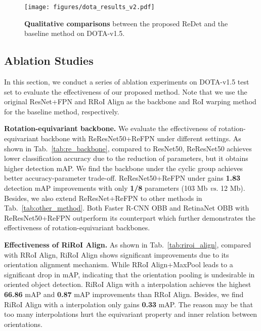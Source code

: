 \documentclass[final]{cvpr}
\begin{document}
{\begin{figure*}
   \begin{center}
      \texttt{[image: figures/dota\_results\_v2.pdf]}      
   \end{center}
   \vspace{-3mm}
   \caption{\textbf{Qualitative comparisons} between the proposed ReDet and the baseline method on DOTA-v1.5.}
  \vspace*{-3mm}
   \label{fig:dota_results}
\end{figure*}



\subsection{Ablation Studies}
In this section, we conduct a series of ablation experiments on DOTA-v1.5 test set to evaluate the effectiveness of our proposed method.
Note that we use the original ResNet+FPN and RRoI Align as the backbone and RoI warping method for the baseline method, respectively. 

{\bf Rotation-equivariant backbone.} We evaluate the effectiveness of rotation-equivariant backbone with ReResNet50+ReFPN under different settings. 
As shown in Tab.~\ref{tab:re_backbone}, compared to ResNet50, ReResNet50 achieves lower classification accuracy due to the reduction of parameters, but it obtains higher detection mAP.
We find the backbone under the cyclic group  achieves better accuracy-parameter trade-off. ReResNet50+ReFPN under  gains \textbf{1.83} detection mAP improvements with only {\bf 1/8} parameters (103 Mb \emph{vs.} 12 Mb).
Besides, we also extend ReResNet+ReFPN to other methods in Tab.~\ref{tab:other_method}. Both Faster R-CNN OBB and RetinaNet OBB with ReResNet50+ReFPN outperform its counterpart which further demonstrates the effectiveness of rotation-equivariant backbones.

{\bf Effectiveness of RiRoI Align.} As shown in Tab.~\ref{tab:riroi_align}, compared with RRoI Align, RiRoI Align shows significant improvements due to its orientation alignment mechanism.
While RRoI Align+MaxPool leads to a significant drop in mAP, indicating that the orientation pooling is undesirable in oriented object detection.
RiRoI Align with a  interpolation achieves the highest \textbf{66.86} mAP and \textbf{0.87} mAP improvements than RRoI Align.
Besides, we find RiRoI Align with a  interpolation only gains \textbf{0.33} mAP. The reason may be that too many interpolations hurt the equivariant property and inner relation between orientations.

}
\end{document}
